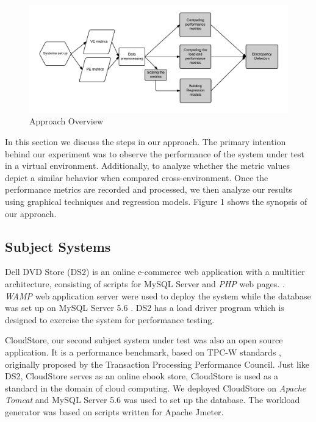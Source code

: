 
\begin{figure}[thb]
	\includegraphics[width=\textwidth]{figures/approach_perf_vr1}
	\caption{Approach Overview}
	\label{fig:Approach}
\end{figure}

In this section we discuss the steps in our approach. The primary intention behind our experiment was to observe the performance of the system under test in a virtual environment. Additionally, to analyze whether the metric values depict a similar behavior when compared cross-environment. Once the performance metrics are recorded and processed, we then analyze our results using graphical techniques and regression models. Figure 1 shows the synopsis of our approach.


\subsection{Subject Systems}
Dell DVD Store (DS2) \cite{delldvd} is an online e-commerce web application with a multitier architecture, consisting of scripts for MySQL Server and \textit{PHP} web pages. \cite{Shang:2015:ADP:2668930.2688052} \cite{Nguyen:2012:ADP:2188286.2188344}. \textit{WAMP} \cite{wamp} web application server were used to deploy the system while the database was set up on MySQL Server 5.6 \cite{mysql}. DS2 has a load driver program which is designed to exercise the system for performance testing.

CloudStore\cite{cloudstore}, our second subject system under test was also an open source application. It is a performance benchmark, based on TPC-W standards \cite{tpcw}, originally proposed by the Transaction Processing Performance Council. Just like DS2, CloudStore serves as an online ebook store, CloudStore is used as a standard in the domain of cloud computing. We deployed CloudStore on \textit{Apache Tomcat} \cite{tomcat} and MySQL Server 5.6 \cite{mysql} was used to set up the database. The workload generator was based on scripts written for Apache Jmeter. \cite{apachejmeter}


